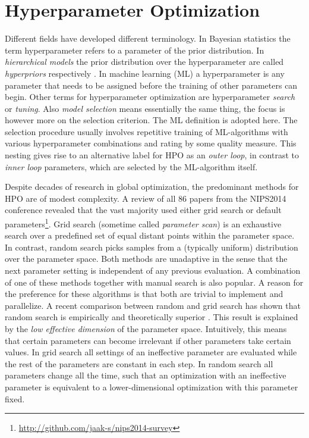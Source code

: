 \documentclass[english]{article}
\begin{document}
\section{Hyperparameter Optimization}
Different fields have developed different terminology. In Bayesian statistics the term hyperparameter refers to a parameter of the prior distribution. In \textit{hierarchical models} the prior distribution over the hyperparameter are called \textit{hyperpriors} respectively \cite[p.408]{bishop_neural_1995}. In machine learning (ML) a hyperparameter is any parameter that needs to be assigned before the training of other parameters can begin. Other terms for hyperparameter optimization are hyperparameter \textit{search} or \textit{tuning}. Also \textit{model selection} means essentially the same thing, the focus is however more on the selection criterion. The ML definition is adopted here. The selection procedure usually involves repetitive training of ML-algorithms with various hyperparameter combinations and rating by some quality measure. This nesting gives rise to an alternative label for HPO as an \textit{outer loop}, in contrast to \textit{inner loop} parameters, which are selected by the ML-algorithm itself.

Despite decades of research in global optimization, the predominant methods for HPO are of modest complexity. A review of all 86 papers from the NIPS2014 conference revealed that the vast majority used either grid search or default parameters\footnote{\url{http://github.com/jaak-s/nips2014-survey}}. Grid search (sometime called \textit{parameter scan}) is an exhaustive search over a predefined set of equal distant points within the parameter space. In contrast, random search picks samples from a (typically uniform) distribution over the parameter space. Both methods are unadaptive in the sense that the next parameter setting is independent of any previous evaluation. A combination of one of these methods together with manual search is also popular. A reason for the preference for these algorithms is that both are trivial to implement and parallelize. A recent comparison between random and grid search has shown that random search is empirically and theoretically superior \cite{bergstra_random_2012}. This result is explained by the  \textit{low effective dimension} of the parameter space. Intuitively, this means that certain parameters can become irrelevant if other parameters take certain values. In grid search all settings of an ineffective parameter are evaluated while the rest of the parameters are constant in each step. In random search all parameters change all the time, such that an optimization with an ineffective parameter is equivalent to a lower-dimensional optimization with this parameter fixed.
\end{document}
